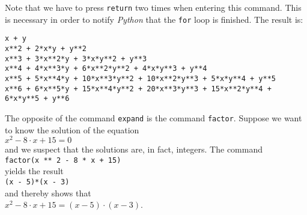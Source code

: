 \documentclass{report}
\begin{document}
Note that we have to press \texttt{return} two times when entering this command.  This is necessary
in order to notify \textsl{Python} that the \texttt{for} loop is finished.  The result is:
\begin{verbatim}
x + y
x**2 + 2*x*y + y**2
x**3 + 3*x**2*y + 3*x*y**2 + y**3
x**4 + 4*x**3*y + 6*x**2*y**2 + 4*x*y**3 + y**4
x**5 + 5*x**4*y + 10*x**3*y**2 + 10*x**2*y**3 + 5*x*y**4 + y**5
x**6 + 6*x**5*y + 15*x**4*y**2 + 20*x**3*y**3 + 15*x**2*y**4 + 6*x*y**5 + y**6
\end{verbatim}
The opposite of the command \texttt{expand} is the command \texttt{factor}.  Suppose we want to know
the solution of the equation
\\[0.2cm]
\hspace*{1.3cm}
$x^2 - 8 \cdot x + 15 = 0$
\\[0.2cm]
and we suspect that the solutions are, in fact, integers.  The command
\\[0.2cm]
\hspace*{1.3cm}
\texttt{factor(x ** 2 - 8 * x + 15)}
\\[0.2cm]
yields the result
\\[0.2cm]
\hspace*{1.3cm}
\texttt{(x - 5)*(x - 3)}
\\[0.2cm]
and thereby shows that
\\[0.2cm]
\hspace*{1.3cm}
$x^2 - 8 \cdot x + 15 = (x - 5) \cdot (x - 3)$.
\end{document}
